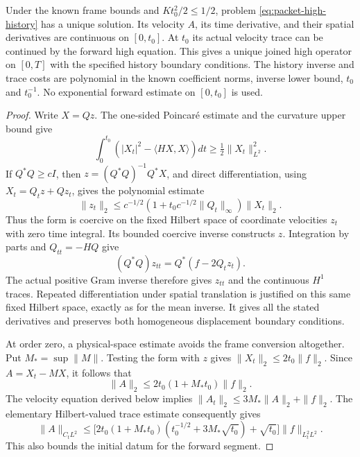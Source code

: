 \begin{lemma}\label{lem:packet-joined-high}
Under the known frame bounds and $Kt_0^2/2\le1/2$, problem
\eqref{eq:packet-high-history} has a unique solution. Its velocity $A$,
its time derivative, and their spatial derivatives are continuous on
$[0,t_0]$. At $t_0$ its actual velocity trace can be continued by the
forward high equation. This gives a unique joined high operator on
$[0,T]$ with the specified history boundary conditions. The history
inverse and trace costs are polynomial in the known coefficient norms,
inverse lower bound, $t_0$ and $t_0^{-1}$. No exponential forward
estimate on $[0,t_0]$ is used.
\end{lemma}
\begin{proof}
Write $X=Qz$. The one-sided Poincar\'e estimate and the curvature upper
bound give
\[
 \int_0^{t_0}(|X_t|^2-\langle HX,X\rangle)dt
       \ge\tfrac12\|X_t\|_{L^2}^2.
\]
If $Q^*Q\ge cI$, then $z=(Q^*Q)^{-1}Q^*X$, and direct differentiation,
using $X_t=Q_tz+Qz_t$, gives the polynomial estimate
\[
 \|z_t\|_2\le
 c^{-1/2}(1+t_0 c^{-1/2}\|Q_t\|_\infty)\|X_t\|_2.
\]
Thus the form is coercive on the fixed Hilbert space of coordinate
velocities $z_t$ with zero time integral. Its bounded coercive inverse
constructs $z$. Integration by parts and $Q_{tt}=-HQ$ give
\[
 (Q^*Q)z_{tt}=Q^*(f-2Q_tz_t).
\]
The actual positive Gram inverse therefore gives $z_{tt}$ and the
continuous $H^1$ traces. Repeated differentiation under spatial
translation is justified on this same fixed Hilbert space, exactly as
for the mean inverse. It gives all the stated derivatives and preserves
both homogeneous displacement boundary conditions.

At order zero, a physical-space estimate avoids the frame
conversion altogether. Put $M_* =\sup\|M\|$. Testing the form with $z$
gives $\|X_t\|_2\le2t_0\|f\|_2$. Since $A=X_t-MX$, it follows that
\[
 \|A\|_2\le2t_0(1+M_*t_0)\|f\|_2.
\]
The velocity equation derived below implies
$\|A_t\|_2\le3M_*\|A\|_2+\|f\|_2$. The elementary Hilbert-valued
trace estimate consequently gives
\begin{equation}\label{eq:packet-history-polynomial-trace}
 \|A\|_{C_tL^2}\le
 \bigl[2t_0(1+M_*t_0)(t_0^{-1/2}+3M_*\sqrt{t_0})
                         +\sqrt{t_0}\bigr]\|f\|_{L^2_tL^2}.
\end{equation}
This also bounds the initial datum for the forward segment.
\end{proof}

